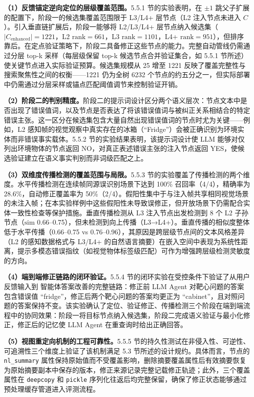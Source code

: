 \textbf{（1）反馈锚定逆向定位的层级覆盖范围。}5.5.1 节的实验表明，在 $\pm 1$ 跳父子扩展的配置下，阶段一的候选集覆盖范围限于 L3/L4+ 层节点（L2 注入节点未进入 $C$）。引入垂直链扩展后，阶段一能够将 L2/L3/L4+ 层节点纳入候选集（$|C_{\mathrm{enhanced}}|=1221$，L2 $\mathrm{rank}=661$，L3 $\mathrm{rank}=1101$，L4+ $\mathrm{rank}=951$），但排序靠后。在定点验证策略下，阶段二具备修正这些节点的能力。完整自动管线仍需通过分层 top-k 采样（每层级保留 top-k 候选节点合并验证集合，如 5.5.1 节所述）使关键节点进入实际验证预算。候选集规模从 25 增至 1221 反映了覆盖完整性与搜索聚焦性之间的权衡——1221 仍为全树 6232 个节点的约五分之一，但实际部署中仍需通过分层采样或锚点匹配阈值调节来控制验证开销。

\textbf{（2）阶段二的判别精度。}阶段二的提示词设计区分两个语义层次：节点文本中是否出现了错误值词，以及节点是否表达了将该错误值词与被纠正关系相结合的特定错误主张。这一区分在候选集包含大量自然出现错误值词的节点时尤为关键——例如，L2 感知帧的视觉观察中真实存在的冰箱（“Fridge”）会被正确识别为环境实体而非错误事实载体。5.5.2 节的实验结果表明，该提示词设计使 LLM 能够对仅列出环境物体的节点返回 NO，对真正表述错误主张的注入节点返回 YES，使候选验证建立在语义事实判别而非词级匹配之上。

\textbf{（3）双维度传播检测的覆盖范围与局限。}5.5.3 节的实验覆盖了传播检测的两个维度。水平传播检测在连续帧同源误识别场景下达到 100\% 召回率（4/4），精确率为 28.6\%，自动修正覆盖率为 50\%（2/4）。假阳性集中于与注入帧共享相同视觉场景的未注入帧；在本实验样例中这些假阳性未导致误修正，但开放场景下仍需配合实体一致性检查等保护措施。垂直传播检测从 L3 注入节点出发检测到 8 个 L2 子孙节点（$\mathrm{sim}$ 0.66–0.75），但未检测到向上传播（L3→L4+）。垂直传播的相似度整体低于水平传播（0.66–0.75 vs 0.76–0.96），其原因是跨层级节点间的文本风格差异（L2 的感知数据格式与 L3/L4+ 的自然语言摘要）在嵌入空间中表现为系统性距离，提示多模态错误指纹（如视觉物体标签级匹配）可作为增强跨层级检测灵敏度的方向。

\textbf{（4）端到端修正链路的闭环验证。}5.5.4 节的闭环实验在受控条件下验证了从用户反馈输入到 智能体答案改善的完整链路：修正前 LLM Agent 对靶心问题的答案包含错误值 “fridge”，修正后两个靶心问题的答案均更正为 “cabinet”，且对照问题的答案保持不变。该实验确认了定位、验证修正、传播检测三个阶段在端到端流程中的协同效果：阶段一将目标节点纳入候选集，阶段二完成语义验证与最小化修正，修正后的记忆使 LLM Agent 在重查询时给出正确回答。

\textbf{（5）视图重定向机制的工程可靠性。}5.5.5 节的持久性测试在非侵入性、可逆性、可追溯性三个维度上验证了该机制满足 5.3 节所述的设计规约。具体而言，节点的 \texttt{nl\_summary} 属性保持原始值而不受覆盖影响，删除摘要覆盖属性后有效摘要恢复为原始摘要副本中保存的版本，修正来源记录完整记载修正轨迹；此外，三个覆盖属性在 \texttt{deepcopy} 和 \texttt{pickle} 序列化往返后均完整保留，确保了修正状态能够通过预处理缓存管道进入评测流程。

